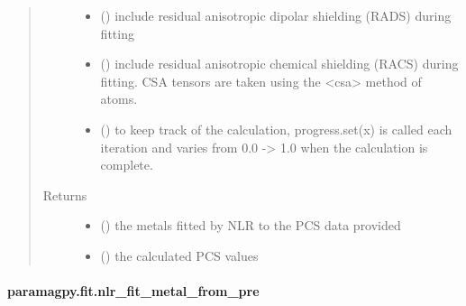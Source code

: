 \documentclass[a4paper,10pt,english]{sphinxmanual}
\begin{document}
\begin{fulllineitems}
\begin{quote}
\begin{description}
\begin{itemize}
\item {} 
 (\sphinxstyleliteralemphasis{\sphinxupquote{, }}) \textendash{} include residual anisotropic dipolar shielding (RADS) during fitting

\item {} 
 (\sphinxstyleliteralemphasis{\sphinxupquote{, }}) \textendash{} include residual anisotropic chemical shielding (RACS) during fitting.
CSA tensors are taken using the \textless{}csa\textgreater{} method of atoms.

\item {} 
 (\sphinxstyleliteralemphasis{\sphinxupquote{, }}) \textendash{} to keep track of the calculation, progress.set(x) is called each
iteration and varies from 0.0 -\textgreater{} 1.0 when the calculation is complete.

\end{itemize}

\item[{Returns}] \leavevmode
\begin{itemize}
\item {} 
 () \textendash{} the metals fitted by NLR to the PCS data provided

\item {} 
 () \textendash{} the calculated PCS values

\end{itemize}


\end{description}\end{quote}

\end{fulllineitems}



\paragraph{paramagpy.fit.nlr\_fit\_metal\_from\_pre}
\label{\detokenize{reference/generated/paramagpy.fit.nlr_fit_metal_from_pre:paramagpy-fit-nlr-fit-metal-from-pre}}\label{\detokenize{reference/generated/paramagpy.fit.nlr_fit_metal_from_pre::doc}}
\end{document}
